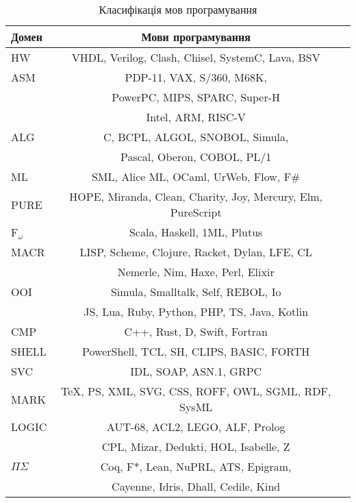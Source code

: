 \begin{table}
  \caption{Класифікація мов програмування}
 \begin{tabular}{lcc}
    \hline
       \textbf{Домен} & \textbf{Мови програмування} \\
    \hline
       HW & VHDL, Verilog, Clash, Chisel, SystemC, Lava, BSV \\
    \hline
\rowcolor{LightGray25}
       ASM & PDP-11, VAX, S/360, M68K,  \\
\rowcolor{LightGray25}
           & PowerPC, MIPS, SPARC, Super-H \\
\rowcolor{LightGray25}
           & Intel, ARM, RISC-V \\
    \hline
       ALG & C, BCPL, ALGOL, SNOBOL, Simula, \\
           & Pascal, Oberon, COBOL, PL/1 \\
    \hline
\rowcolor{LightGray}
       ML & SML, Alice ML, OCaml, UrWeb, Flow, F\# \\
    \hline
\rowcolor{LightGray}
       PURE & HOPE, Miranda, Clean, Charity, Joy, Mercury, Elm, PureScript \\
    \hline
\rowcolor{LightGray}
       F$_\omega$ & Scala, Haskell, 1ML, Plutus \\
    \hline
\rowcolor{LightGray25}
       MACR & LISP, Scheme, Clojure, Racket, Dylan, LFE, CL \\
\rowcolor{LightGray25}
            & Nemerle, Nim, Haxe, Perl, Elixir \\
    \hline
\rowcolor{LightGray25}
       OOI & Simula, Smalltalk, Self, REBOL, Io \\
\rowcolor{LightGray25}
           & JS, Lua, Ruby, Python, PHP, TS, Java, Kotlin \\
    \hline
\rowcolor{LightGray25}
       CMP & C++, Rust, D, Swift, Fortran \\
    \hline
       SHELL & PowerShell, TCL, SH, CLIPS, BASIC, FORTH \\
    \hline
       SVC & IDL, SOAP, ASN.1, GRPC \\
    \hline
       MARK & TeX, PS, XML, SVG, CSS, ROFF, OWL, SGML, RDF, SysML \\
    \hline
       LOGIC & AUT-68, ACL2, LEGO, ALF, Prolog \\
             & CPL, Mizar, Dedukti, HOL, Isabelle, Z \\
    \hline
\rowcolor{LightGray}
       $\Pi\Sigma$ & Coq, F*, Lean, NuPRL, ATS, Epigram, \\
\rowcolor{LightGray}
          & Cayenne, Idris, Dhall, Cedile, Kind \\

\end{tabular}
\end{table}
